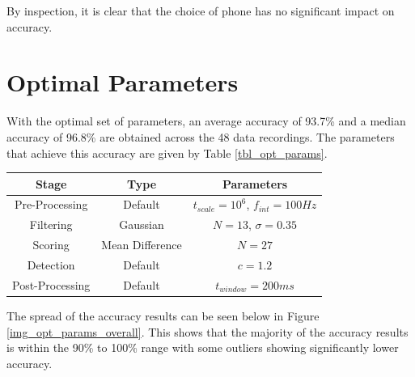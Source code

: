                 By inspection, it is clear that the choice of phone has no significant impact on accuracy.           

        \section{Optimal Parameters}

            With the optimal set of parameters, an average accuracy of 93.7\% and a median accuracy of 96.8\% are obtained across the 48 data recordings. The parameters that achieve this accuracy are given by Table \ref{tbl_opt_params}.

            \begin{center}
                \label{tbl_opt_params}
                \begin{tabular}{|c|c|c|}
                    \hline
                    Stage & Type & Parameters \\
                    \hline
                    Pre-Processing & Default & $t_{scale}=10^6$, $f_{int}=100Hz$ \\
                    Filtering & Gaussian & $N=13$, $\sigma=0.35$ \\
                    Scoring & Mean Difference & $N=27$ \\
                    Detection & Default & $c=1.2$ \\
                    Post-Processing & Default & $t_{window}=200ms$ \\
                    \hline
                \end{tabular}
            \end{center}

            The spread of the accuracy results can be seen below in Figure \ref{img_opt_params_overall}. This shows that the majority of the accuracy results is within the 90\% to 100\% range with some outliers showing significantly lower accuracy.

